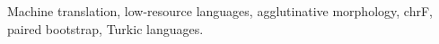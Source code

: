 \documentclass[journal]{IEEEtran}
\begin{document}
\begin{IEEEkeywords}
Machine translation, low-resource languages, agglutinative morphology, chrF, paired bootstrap, Turkic languages.
\end{IEEEkeywords}











\end{document}
